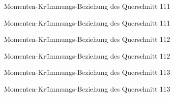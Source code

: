 \documentclass[
  11pt,
  letterpaper,
]{scrreprt}
\begin{document}
\begin{figure}[H]


\caption{\label{fig-qs_111}Momenten-Krümmungs-Beziehung des Querschnitt
111}

\end{figure}%

\begin{figure}[H]


\caption{\label{fig-m_chi_111}Momenten-Krümmungs-Beziehung des
Querschnitt 111}

\end{figure}%

\begin{figure}[H]


\caption{\label{fig-qs_112}Momenten-Krümmungs-Beziehung des Querschnitt
112}

\end{figure}%

\begin{figure}[H]


\caption{\label{fig-m_chi_112}Momenten-Krümmungs-Beziehung des
Querschnitt 112}

\end{figure}%

\begin{figure}[H]


\caption{\label{fig-qs_113}Momenten-Krümmungs-Beziehung des Querschnitt
113}

\end{figure}%

\begin{figure}[H]


\caption{\label{fig-m_chi_113}Momenten-Krümmungs-Beziehung des
Querschnitt 113}

\end{figure}%
\end{document}
